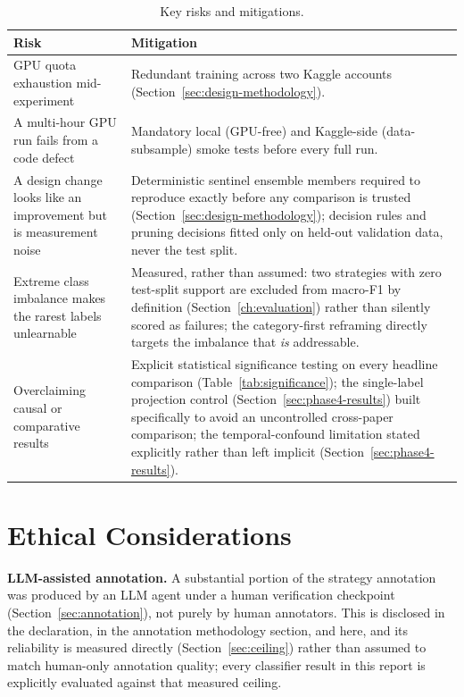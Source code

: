 \begin{table}[H]
\centering
\caption{Key risks and mitigations.}
\label{tab:risks}
\begin{tabular}{@{}p{4.3cm}p{8.5cm}@{}}
\toprule
\textbf{Risk} & \textbf{Mitigation} \\
\midrule
GPU quota exhaustion mid-experiment & Redundant training across two Kaggle accounts (Section~\ref{sec:design-methodology}). \\
A multi-hour GPU run fails from a code defect & Mandatory local (GPU-free) and Kaggle-side (data-subsample) smoke tests before every full run. \\
A design change looks like an improvement but is measurement noise & Deterministic sentinel ensemble members required to reproduce exactly before any comparison is trusted (Section~\ref{sec:design-methodology}); decision rules and pruning decisions fitted only on held-out validation data, never the test split. \\
Extreme class imbalance makes the rarest labels unlearnable & Measured, rather than assumed: two strategies with zero test-split support are excluded from macro-F1 by definition (Section~\ref{ch:evaluation}) rather than silently scored as failures; the category-first reframing directly targets the imbalance that \emph{is} addressable. \\
Overclaiming causal or comparative results & Explicit statistical significance testing on every headline comparison (Table~\ref{tab:significance}); the single-label projection control (Section~\ref{sec:phase4-results}) built specifically to avoid an uncontrolled cross-paper comparison; the temporal-confound limitation stated explicitly rather than left implicit (Section~\ref{sec:phase4-results}). \\
\bottomrule
\end{tabular}
\end{table}

\section{Ethical Considerations}

\textbf{LLM-assisted annotation.} A substantial portion of the strategy
annotation was produced by an LLM agent under a human verification
checkpoint (Section~\ref{sec:annotation}), not purely by human annotators.
This is disclosed in the declaration, in the annotation methodology section,
and here, and its reliability is measured directly (Section~\ref{sec:ceiling})
rather than assumed to match human-only annotation quality; every classifier
result in this report is explicitly evaluated against that measured ceiling.

